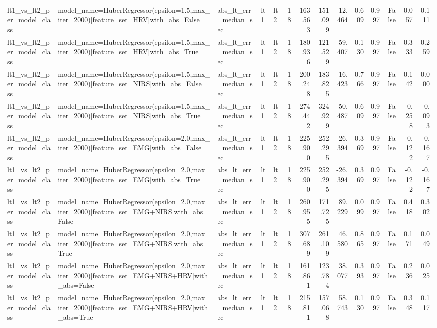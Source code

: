 \begin{table}
\begin{tabular}{lllllrrrrrrrrr}
lt1_vs_lt2_per_model_class & model_name=HuberRegressor(epsilon=1.5,max_iter=2000)|feature_set=HRV|with_abs=False & abs_lt_err_median_sec & lt1 & lt2 & 18 & 163.563 & 151.099 & 12.464 & 0.609 & 0.997 & False & 0.057 & 0.111 \\
lt1_vs_lt2_per_model_class & model_name=HuberRegressor(epsilon=1.5,max_iter=2000)|feature_set=HRV|with_abs=True & abs_lt_err_median_sec & lt1 & lt2 & 18 & 180.936 & 121.529 & 59.407 & 0.130 & 0.997 & False & 0.333 & 0.259 \\
lt1_vs_lt2_per_model_class & model_name=HuberRegressor(epsilon=1.5,max_iter=2000)|feature_set=NIRS|with_abs=False & abs_lt_err_median_sec & lt1 & lt2 & 18 & 200.248 & 183.825 & 16.423 & 0.766 & 0.997 & False & 0.142 & 0.000 \\
lt1_vs_lt2_per_model_class & model_name=HuberRegressor(epsilon=1.5,max_iter=2000)|feature_set=NIRS|with_abs=True & abs_lt_err_median_sec & lt1 & lt2 & 18 & 274.442 & 324.929 & -50.487 & 0.609 & 0.997 & False & -0.258 & -0.093 \\
lt1_vs_lt2_per_model_class & model_name=HuberRegressor(epsilon=2.0,max_iter=2000)|feature_set=EMG|with_abs=False & abs_lt_err_median_sec & lt1 & lt2 & 18 & 225.900 & 252.295 & -26.394 & 0.369 & 0.997 & False & -0.122 & -0.167 \\
lt1_vs_lt2_per_model_class & model_name=HuberRegressor(epsilon=2.0,max_iter=2000)|feature_set=EMG|with_abs=True & abs_lt_err_median_sec & lt1 & lt2 & 18 & 225.900 & 252.295 & -26.394 & 0.369 & 0.997 & False & -0.122 & -0.167 \\
lt1_vs_lt2_per_model_class & model_name=HuberRegressor(epsilon=2.0,max_iter=2000)|feature_set=EMG+NIRS|with_abs=False & abs_lt_err_median_sec & lt1 & lt2 & 18 & 260.955 & 171.725 & 89.229 & 0.099 & 0.997 & False & 0.418 & 0.302 \\
lt1_vs_lt2_per_model_class & model_name=HuberRegressor(epsilon=2.0,max_iter=2000)|feature_set=EMG+NIRS|with_abs=True & abs_lt_err_median_sec & lt1 & lt2 & 18 & 307.689 & 261.109 & 46.580 & 0.865 & 0.997 & False & 0.171 & 0.049 \\
lt1_vs_lt2_per_model_class & model_name=HuberRegressor(epsilon=2.0,max_iter=2000)|feature_set=EMG+NIRS+HRV|with_abs=False & abs_lt_err_median_sec & lt1 & lt2 & 18 & 161.861 & 123.784 & 38.077 & 0.393 & 0.997 & False & 0.236 & 0.025 \\
lt1_vs_lt2_per_model_class & model_name=HuberRegressor(epsilon=2.0,max_iter=2000)|feature_set=EMG+NIRS+HRV|with_abs=True & abs_lt_err_median_sec & lt1 & lt2 & 18 & 215.811 & 157.068 & 58.743 & 0.130 & 0.997 & False & 0.348 & 0.117 \\

\end{tabular}
\end{table}
